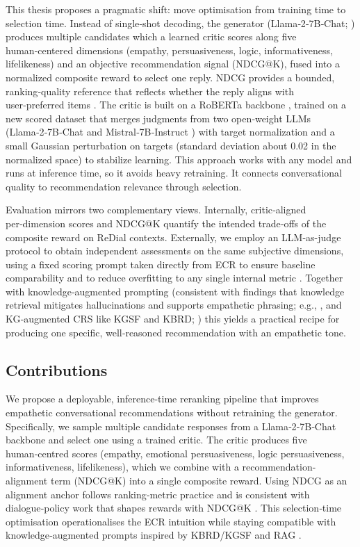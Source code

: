 \documentclass[12pt]{article}
\begin{document}
  This thesis proposes a pragmatic shift: move optimisation from training time to selection time. Instead of single‑shot decoding, the generator (Llama‑2‑7B‑Chat; \citealp{meta2023llama2}) produces multiple candidates which a learned critic scores along five human‑centered dimensions (empathy, persuasiveness, logic, informativeness, lifelikeness) and an objective recommendation signal (NDCG@K), fused into a normalized composite reward to select one reply. NDCG provides a bounded, ranking‑quality reference that reflects whether the reply aligns with user‑preferred items \citep{evidently_ndcg}. The critic is built on a RoBERTa backbone \citep{liu2019roberta}, trained on a new scored dataset that merges judgments from two open‑weight LLMs (Llama‑2‑7B‑Chat \citep{meta2023llama2} and Mistral‑7B‑Instruct \citep{mistral2023}) with target normalization and a small Gaussian perturbation on targets (standard deviation about 0.02 in the normalized space) to stabilize learning. This approach works with any model and runs at inference time, so it avoids heavy retraining. It connects conversational quality to recommendation relevance through selection.
  
  Evaluation mirrors two complementary views. Internally, critic‑aligned per‑dimension scores and NDCG@K quantify the intended trade‑offs of the composite reward on ReDial contexts. 
  Externally, we employ an LLM-as-judge protocol to obtain independent assessments on the same subjective dimensions, using a fixed scoring prompt taken directly from ECR to ensure baseline comparability and to reduce overfitting to any single internal metric \citep{zhang2024ecr,yan2023llmjudge}. Together with knowledge‑augmented prompting (consistent with findings that knowledge retrieval mitigates hallucinations and supports empathetic phrasing; e.g., \citealp{zeng2022knowledgebridging}, and KG‑augmented CRS like KGSF and KBRD; \citealp{zhou2020kgsf,chen2020kbrd}) this yields a practical recipe for producing one specific, well‑reasoned recommendation with an empathetic tone.
  
  \subsection{Contributions}
  We propose a deployable, inference-time reranking pipeline that improves empathetic conversational recommendations without retraining the generator. Specifically, we sample multiple candidate responses from a Llama‑2‑7B‑Chat backbone \citep{meta2023llama2} and select one using a trained critic. The critic produces five human‑centred scores (empathy, emotional persuasiveness, logic persuasiveness, informativeness, lifelikeness), which we combine with a recommendation- alignment term (NDCG@K) into a single composite reward. Using NDCG as an alignment anchor follows ranking‑metric practice and is consistent with dialogue‑policy work that shapes rewards with NDCG@K \citep{chen2021crsdp}. This selection‑time optimisation operationalises the ECR intuition \citep{zhang2024ecr} while staying compatible with knowledge‑augmented prompts inspired by KBRD/KGSF and RAG \citep{chen2020kbrd,zhou2020kgsf,lewis2020rag}.
  
\end{document}
